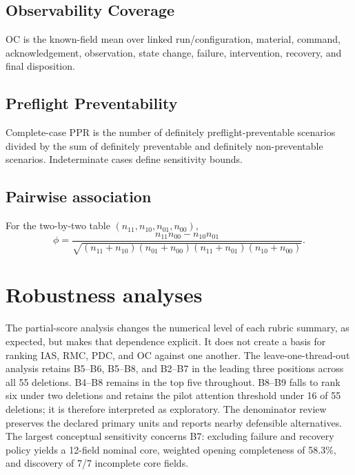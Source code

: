 \documentclass[preprint,12pt]{elsarticle}
\begin{document}
\subsection{Observability Coverage}
OC is the known-field mean over linked run/configuration, material, command, acknowledgement, observation, state change, failure, intervention, recovery, and final disposition.

\subsection{Preflight Preventability}
Complete-case PPR is the number of definitely preflight-preventable scenarios divided by the sum of definitely preventable and definitely non-preventable scenarios. Indeterminate cases define sensitivity bounds.

\subsection{Pairwise association}
For the two-by-two table $(n_{11},n_{10},n_{01},n_{00})$,
\[
  \phi=\frac{n_{11}n_{00}-n_{10}n_{01}}
  {\sqrt{(n_{11}+n_{10})(n_{01}+n_{00})(n_{11}+n_{01})(n_{10}+n_{00})}}.
\]

\section{Robustness analyses}






The partial-score analysis changes the numerical level of each rubric summary, as expected, but makes that dependence explicit. It does not create a basis for ranking IAS, RMC, PDC, and OC against one another. The leave-one-thread-out analysis retains B5--B6, B5--B8, and B2--B7 in the leading three positions across all 55 deletions. B4--B8 remains in the top five throughout. B8--B9 falls to rank six under two deletions and retains the pilot attention threshold under 16 of 55 deletions; it is therefore interpreted as exploratory. The denominator review preserves the declared primary units and reports nearby defensible alternatives. The largest conceptual sensitivity concerns B7: excluding failure and recovery policy yields a 12-field nominal core, weighted opening completeness of 58.3\%, and discovery of 7/7 incomplete core fields.
\end{document}
